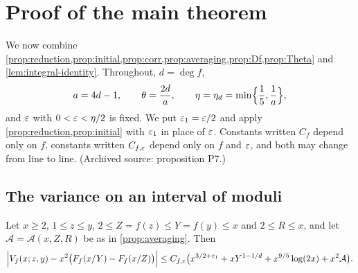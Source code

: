 \chapter{Proof of the main theorem}\label{ch:assembly}

We now combine \cref{prop:reduction,prop:initial,prop:corr,prop:averaging,prop:Df,prop:Theta} and \cref{lem:integral-identity}. Throughout, $d=\deg f$,
\[
a=4d-1,\qquad\theta=\frac{2d}a,\qquad\eta=\eta_d=\min\Bigl\{\frac15,\frac1a\Bigr\},
\]
and $\varepsilon$ with $0<\varepsilon<\eta/2$ is fixed. We put $\varepsilon_1=\varepsilon/2$ and apply \cref{prop:reduction,prop:initial} with $\varepsilon_1$ in place of $\varepsilon$. Constants written $C_f$ depend only on $f$, constants written $C_{f,\varepsilon}$ depend only on $f$ and $\varepsilon$, and both may change from line to line. (Archived source: proposition P7.)

\section{The variance on an interval of moduli}

\begin{lemma}\label{lem:interval}
Let $x\ge2$, $1\le z\le y$, $2\le Z=f(z)\le Y=f(y)\le x$ and $2\le R\le x$, and let $\mathcal A=\mathcal A(x,Z,R)$ be as in \cref{prop:averaging}. Then
\[
\Bigl|V_f(x;z,y)-x^2\bigl(F_f(x/Y)-F_f(x/Z)\bigr)\Bigr|\le C_{f,\varepsilon}\bigl(x^{3/2+\varepsilon_1}+xY^{1-1/d}+x^{9/5}\log(2x)+x^2\mathcal A\bigr).
\]
\end{lemma}


